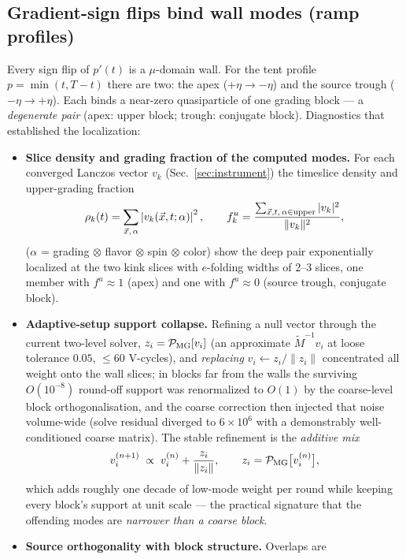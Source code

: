 \documentclass[11pt]{article}
\newcommand{\Mt}{\widetilde{M}}
\begin{document}
\subsection{Gradient-sign flips bind wall modes (ramp profiles)}
Every sign flip of $p'(t)$ is a $\mu$-domain wall.  For the tent profile
$p=\min(t,T{-}t)$ there are two: the apex ($+\eta\to-\eta$) and the source
trough ($-\eta\to+\eta$).  Each binds a near-zero quasiparticle of one
grading block --- a \emph{degenerate pair} (apex: upper block; trough:
conjugate block).  Diagnostics that established the localization:
\begin{itemize}
\item \textbf{Slice density and grading fraction of the computed
modes.}  For each converged Lanczos vector $v_k$
(Sec.~\ref{sec:instrument}) the timeslice density and upper-grading
fraction
\begin{equation}
\rho_k(t) = \sum_{\vec x,\,\alpha} \left|v_k(\vec x, t;\alpha)\right|^2,
\qquad
f_k^{u} = \frac{\sum_{\vec x, t,\,\alpha\in\rm upper}
|v_k|^2}{\|v_k\|^2},
\end{equation}
($\alpha$ = grading $\otimes$ flavor $\otimes$ spin $\otimes$ color)
show the deep pair exponentially localized at the two kink slices with
$e$-folding widths of 2--3 slices, one member with $f^u \approx 1$
(apex) and one with $f^u \approx 0$ (source trough, conjugate block).
\item \textbf{Adaptive-setup support collapse.}  Refining a null vector
through the current two-level solver,
$z_i = \mathcal{P}_{\rm MG}[v_i]$ (an approximate $\Mt^{-1}v_i$ at
loose tolerance $0.05$, $\le 60$ V-cycles), and \emph{replacing}
$v_i \leftarrow z_i/\|z_i\|$ concentrated all weight onto the wall
slices; in blocks far from the walls the surviving $O(10^{-8})$
round-off support was renormalized to $O(1)$ by the coarse-level block
orthogonalisation, and the coarse correction then injected that noise
volume-wide (solve residual diverged to $6\times10^6$ with a
demonstrably well-conditioned coarse matrix).  The stable refinement is
the \emph{additive mix}
\begin{equation}
v_i^{(n+1)} \;\propto\; v_i^{(n)} + \frac{z_i}{\|z_i\|},
\qquad z_i = \mathcal{P}_{\rm MG}\big[v_i^{(n)}\big],
\end{equation}
which adds roughly one decade of low-mode weight per round while
keeping every block's support at unit scale --- the practical signature
that the offending modes are \emph{narrower than a coarse block}.
\item \textbf{Source orthogonality with block structure.}  Overlaps are

\end{itemize}
\end{document}
